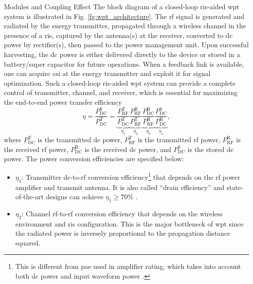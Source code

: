 \begin{section}{}
\begin{subsection}{Modules and Coupling Effect}
		The block diagram of a closed-loop \gls{ris}-aided \gls{wpt} system is illustrated in Fig. \ref{fg:wpt_architecture}.
		The \gls{rf} signal is generated and radiated by the energy transmitter, propagated through a wireless channel in the presence of a \gls{ris}, captured by the antenna(s) at the receiver, converted to \gls{dc} power by rectifier(s), then passed to the power management unit.
		Upon successful harvesting, the \gls{dc} power is either delivered directly to the device or stored in a battery/super capacitor for future operations.
		When a feedback link is available, one can acquire \gls{csi} at the energy transmitter and exploit it for signal optimization.
		Such a closed-loop \gls{ris}-aided \gls{wpt} system can provide a complete control of transmitter, channel, and receiver, which is essential for maximizing the end-to-end power transfer efficiency
		\begin{equation}
			\eta = \frac{P_{\mathrm{DC}}^\mathrm{S}}{P_{\mathrm{DC}}^\mathrm{T}} = \underbrace{\frac{P_{\mathrm{RF}}^\mathrm{T}}{P_{\mathrm{DC}}^\mathrm{T}}}_{\eta_1} \underbrace{\frac{P_{\mathrm{RF}}^\mathrm{R}}{P_{\mathrm{RF}}^\mathrm{T}}}_{\eta_2} \underbrace{\frac{P_{\mathrm{DC}}^\mathrm{R}}{P_{\mathrm{RF}}^\mathrm{R}}}_{\eta_3} \underbrace{\frac{P_{\mathrm{DC}}^\mathrm{S}}{P_{\mathrm{DC}}^\mathrm{R}}}_{\eta_4},
		\end{equation}
		where $P_{\mathrm{DC}}^\mathrm{T}$ is the transmitted \gls{dc} power, $P_{\mathrm{RF}}^\mathrm{T}$ is the transmitted \gls{rf} power, $P_{\mathrm{RF}}^\mathrm{R}$ is the received \gls{rf} power, $P_{\mathrm{DC}}^\mathrm{R}$ is the received \gls{dc} power, and $P_{\mathrm{DC}}^\mathrm{S}$ is the stored \gls{dc} power.
		The power conversion efficiencies are specified below:
		\begin{itemize}
			\item $\eta_1$: Transmitter \gls{dc}-to-\gls{rf} conversion efficiency\footnote{This is different from \gls{pae} used in amplifier rating, which takes into account both \gls{dc} power and input waveform power \cite{Joung2015}.} that depends on the \gls{rf} power amplifier and transmit antenna. It is also called ``drain efficiency'' and state-of-the-art designs can achieve $\eta_1 \ge 70\%$ \cite{Alizadeh2020}.
			\item $\eta_2$: Channel \gls{rf}-to-\gls{rf} conversion efficiency that depends on the wireless environment and \gls{ris} configuration. This is the major bottleneck of \gls{wpt} since the radiated power is inversely proportional to the propagation distance squared.

\end{itemize}
\end{subsection}
\end{section}
